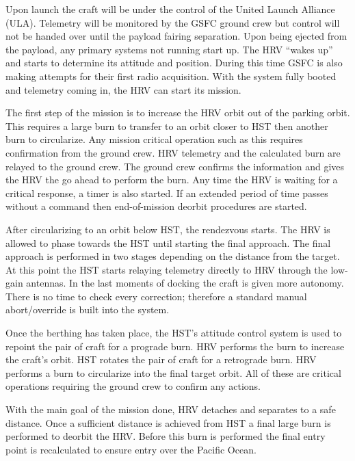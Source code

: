 \documentclass[paper=letter, fontsize=11pt]{scrartcl} %
\numberwithin{equation}{section} %
\numberwithin{figure}{section} %
\numberwithin{table}{section} %
\begin{document}
Upon launch the craft will be under the control of the United Launch Alliance (ULA). Telemetry will be monitored by the GSFC ground crew but control will not be handed over until the payload fairing separation. Upon being ejected from the payload, any primary systems not running start up. The HRV ``wakes up'' and starts to determine its attitude and position. During this time GSFC is also making attempts for their first radio acquisition. With the system fully booted and telemetry coming in, the HRV can start its mission.

The first step of the mission is to increase the HRV orbit out of the parking orbit. This requires a large burn to transfer to an orbit closer to HST then another burn to circularize. Any mission critical operation such as this requires confirmation from the ground crew. HRV telemetry and the calculated burn are relayed to the ground crew. The ground crew confirms the information and gives the HRV the go ahead to perform the burn. Any time the HRV is waiting for a critical response, a timer is also started. If an extended period of time passes without a command then end-of-mission deorbit procedures are started.

After circularizing to an orbit below HST, the rendezvous starts. The HRV is allowed to phase towards the HST until starting the final approach. The final approach is performed in two stages depending on the distance from the target. At this point the HST starts relaying telemetry directly to HRV through the low-gain antennas. In the last moments of docking the craft is given more autonomy. There is no time to check every correction; therefore a standard manual abort/override is built into the system.

Once the berthing has taken place, the HST's attitude control system is used to repoint the pair of craft for a prograde burn. HRV performs the burn to increase the craft's orbit. HST rotates the pair of craft for a retrograde burn. HRV performs a burn to circularize into the final target orbit. All of these are critical operations requiring the ground crew to confirm any actions.

With the main goal of the mission done, HRV detaches and separates to a safe distance. Once a sufficient distance is achieved from HST a final large burn is performed to deorbit the HRV. Before this burn is performed the final entry point is recalculated to ensure entry over the Pacific Ocean.


\end{document}
